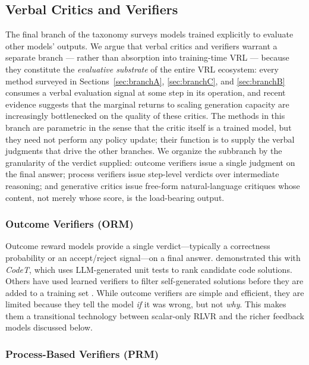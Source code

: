 \subsection{Verbal Critics and Verifiers}
\label{sec:branchD}

The final branch of the taxonomy surveys models trained explicitly to evaluate other models' outputs. We argue that verbal critics and verifiers warrant a separate branch --- rather than absorption into training-time VRL --- because they constitute the \emph{evaluative substrate} of the entire VRL ecosystem: every method surveyed in Sections~\ref{sec:branchA}, \ref{sec:branchC}, and \ref{sec:branchB} consumes a verbal evaluation signal at some step in its operation, and recent evidence suggests that the marginal returns to scaling generation capacity are increasingly bottlenecked on the quality of these critics. The methods in this branch are parametric in the sense that the critic itself is a trained model, but they need not perform any policy update; their function is to supply the verbal judgments that drive the other branches. We organize the subbranch by the granularity of the verdict supplied: outcome verifiers issue a single judgment on the final answer; process verifiers issue step-level verdicts over intermediate reasoning; and generative critics issue free-form natural-language critiques whose content, not merely whose score, is the load-bearing output.

\subsubsection{Outcome Verifiers (ORM)}

Outcome reward models provide a single verdict—typically a correctness probability or an accept/reject signal—on a final answer. \citet{chen2022codet} demonstrated this with \textit{CodeT}, which uses LLM-generated unit tests to rank candidate code solutions. Others have used learned verifiers to filter self-generated solutions before they are added to a training set \citep{hosseini2024vstar}. While outcome verifiers are simple and efficient, they are limited because they tell the model \textit{if} it was wrong, but not \textit{why}. This makes them a transitional technology between scalar-only RLVR and the richer feedback models discussed below.

\subsubsection{Process-Based Verifiers (PRM)}

